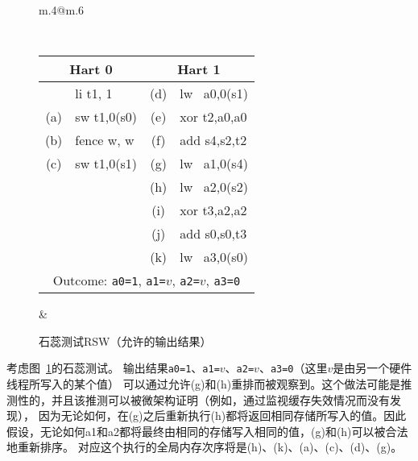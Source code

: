 \begin{figure}[h!]
  \centering
  \begin{tabular}{m{.4\linewidth}@{\qquad\quad}m{.6\linewidth}}
  {
    \tt\small
    \begin{tabular}{cl||cl}
    \multicolumn{2}{c}{Hart 0} & \multicolumn{2}{c}{Hart 1} \\
    \hline
          & li t1, 1    & (d) & lw~ a0,0(s1) \\
      (a) & sw t1,0(s0) & (e) & xor t2,a0,a0 \\
      (b) & fence w, w  & (f) & add s4,s2,t2 \\
      (c) & sw t1,0(s1) & (g) & lw~ a1,0(s4) \\
          &             & (h) & lw~ a2,0(s2) \\
          &             & (i) & xor t3,a2,a2 \\
          &             & (j) & add s0,s0,t3 \\
          &             & (k) & lw~ a3,0(s0) \\
      \hline
      \multicolumn{4}{c}{Outcome: {\tt a0=1}, {\tt a1=$v$}, {\tt a2=$v$}, {\tt a3=0}}
    \end{tabular}
  }
  &
  
   \end{tabular}
  \caption{石蕊测试RSW（允许的输出结果） 
  }
  \label{fig:litmus:rsw}
\end{figure}

考虑图~\ref{fig:litmus:rsw}的石蕊测试。
输出结果{\tt a0=1}、{\tt a1=$v$}、{\tt a2=$v$}、{\tt a3=0}（这里$v$是由另一个硬件线程所写入的某个值）
可以通过允许(g)和(h)重排而被观察到。这个做法可能是推测性的，并且该推测可以被微架构证明（例如，通过监视缓存失效情况而没有发现），
因为无论如何，在(g)之后重新执行(h)都将返回相同存储所写入的值。因此假设，无论如何a1和a2都将最终由相同的存储写入相同的值，(g)和(h)可以被合法地重新排序。
对应这个执行的全局内存次序将是(h)、(k)、(a)、(c)、(d)、(g)。

